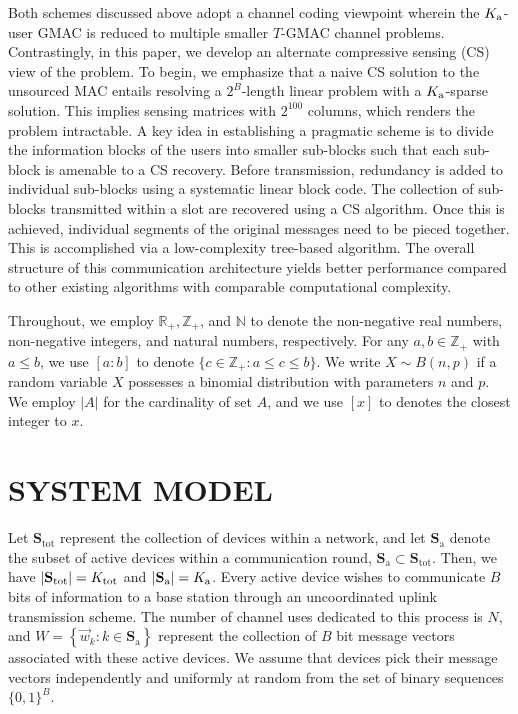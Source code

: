\documentclass{article}
\begin{document}
Both schemes discussed above adopt a channel coding viewpoint wherein the $K_\mathrm{a}$-user GMAC is reduced to multiple smaller $T$-GMAC channel problems.
Contrastingly, in this paper, we develop an alternate compressive sensing (CS) view of the problem.
To begin, we emphasize that a naive CS solution to the unsourced MAC entails resolving a $2^B$-length linear problem with a $K_\mathrm{a}$-sparse solution.
This implies sensing matrices with $2^{100}$ columns, which renders the problem intractable.
A key idea in establishing a pragmatic scheme is to divide the information blocks of the users into smaller sub-blocks such that each sub-block is amenable to a CS recovery.
Before transmission, redundancy is added to individual sub-blocks using a systematic linear block code.
The collection of sub-blocks transmitted within a slot are recovered using a CS algorithm.
Once this is achieved, individual segments of the original messages need to be pieced together.
This is accomplished via a low-complexity tree-based algorithm.
The overall structure of this communication architecture yields better performance compared to other existing algorithms with comparable computational complexity.

Throughout, we employ $\mathbb{R}_{+}, \mathbb{Z}_{+}$, and $\mathbb{N}$ to denote the non-negative real numbers, non-negative integers, and natural numbers, respectively.
For any $a,b \in  \mathbb{Z}_{+}$ with $a \le b$, we use $[a:b]$ to denote $\{c \in \mathbb{Z}_{+}: a \le c \le b \}$.
We write $X \sim B(n,p)$ if a random variable $X$ possesses a binomial distribution with parameters $n$ and $p$.
We employ $|A|$ for the cardinality of set $A$, and we use $[x]$ to denotes the closest integer to $x$.


\section{SYSTEM MODEL}
\label{sec:systemmodel}

Let $\mathbf{S}_\mathrm{tot}$ represent the collection of devices within a network, and let $\mathbf{S}_\mathrm{a}$ denote the subset of active devices within a communication round, $\mathbf{S}_\mathrm{a} \subset \mathbf{S}_\mathrm{tot}$.
Then, we have $|\mathbf{S}_\mathrm{tot}| = K_\mathrm{tot}$ and $|\mathbf{S}_\mathrm{a}| = K_\mathrm{a}$.
Every active device wishes to communicate $B$ bits of information to a base station through an uncoordinated uplink transmission scheme.
The number of channel uses dedicated to this process is $N$, and $\mathit{W} = \left\{ \vec{\mathit{w}}_k:k \in \mathbf{S}_\mathrm{a} \right\}$ represent the collection of $B$ bit message vectors associated with these active devices.
We assume that devices pick their message vectors independently and uniformly at random from the set of binary sequences $\{0, 1\}^B$.
\end{document}
